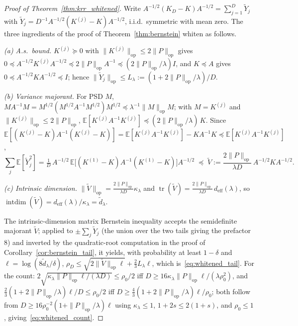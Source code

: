 \documentclass{article}
\begin{document}
\begin{proof}[Proof of Theorem~\ref{thm:krr_whitened}]
Write $A^{-1/2}(K_D-K)A^{-1/2}=\sum_{j=1}^D\widetilde Y_j$ with $\widetilde Y_j=D^{-1}A^{-1/2}(K^{(j)}-K)A^{-1/2}$, i.i.d.\ symmetric with mean zero. The three ingredients of the proof of Theorem~\ref{thm:bernstein} whiten as follows.

\emph{(a) A.s.\ bound.} $K^{(j)}\succeq0$ with $\|K^{(j)}\|_{\mathrm{op}}\le2\|P\|_{\mathrm{op}}$ gives $0\preceq A^{-1/2}K^{(j)}A^{-1/2}\preceq2\|P\|_{\mathrm{op}}A^{-1}\preceq(2\|P\|_{\mathrm{op}}/\lambda)I$, and $K\preceq A$ gives $0\preceq A^{-1/2}KA^{-1/2}\preceq I$; hence $\|\widetilde Y_j\|_{\mathrm{op}}\le L_\lambda:=(1+2\|P\|_{\mathrm{op}}/\lambda)/D$.

\emph{(b) Variance majorant.} For PSD $M$, $MA^{-1}M=M^{1/2}(M^{1/2}A^{-1}M^{1/2})M^{1/2}\preceq\lambda^{-1}\|M\|_{\mathrm{op}}M$; with $M=K^{(j)}$ and $\|K^{(j)}\|_{\mathrm{op}}\le2\|P\|_{\mathrm{op}}$, $\mathbb{E}[K^{(j)}A^{-1}K^{(j)}]\preceq(2\|P\|_{\mathrm{op}}/\lambda)\,K$. Since $\mathbb{E}[(K^{(j)}-K)A^{-1}(K^{(j)}-K)]=\mathbb{E}[K^{(j)}A^{-1}K^{(j)}]-KA^{-1}K\preceq\mathbb{E}[K^{(j)}A^{-1}K^{(j)}]$,
\[
\sum_{j}\mathbb{E}[\widetilde Y_j^2]=\tfrac1D\,A^{-1/2}\,\mathbb{E}\bigl[(K^{(1)}-K)A^{-1}(K^{(1)}-K)\bigr]A^{-1/2}\;\preceq\;\widetilde V:=\frac{2\|P\|_{\mathrm{op}}}{\lambda D}\,A^{-1/2}KA^{-1/2}.
\]

\emph{(c) Intrinsic dimension.} $\|\widetilde V\|_{\mathrm{op}}=\frac{2\|P\|_{\mathrm{op}}}{\lambda D}\kappa_\lambda$ and $\operatorname{tr}(\widetilde V)=\frac{2\|P\|_{\mathrm{op}}}{\lambda D}\,d_{\mathrm{eff}}(\lambda)$, so $\operatorname{intdim}(\widetilde V)=d_{\mathrm{eff}}(\lambda)/\kappa_\lambda=\tilde d_\lambda$.

The intrinsic-dimension matrix Bernstein inequality \citep[Thm.~7.3.1]{tropp2015matrix} accepts the semidefinite majorant $\widetilde V$; applied to $\pm\sum_j\widetilde Y_j$ (the union over the two tails giving the prefactor $8$) and inverted by the quadratic-root computation in the proof of Corollary~\ref{cor:bernstein_tail}, it yields, with probability at least $1-\delta$ and $\ell=\log(8\tilde d_\lambda/\delta)$, $\rho_D\le\sqrt{2\|\widetilde V\|_{\mathrm{op}}\ell}+\tfrac23L_\lambda\ell$, which is~\eqref{eq:whitened_tail}. For the count: $2\sqrt{\kappa_\lambda\|P\|_{\mathrm{op}}\ell/(\lambda D)}\le\rho_0/2$ iff $D\ge16\kappa_\lambda\|P\|_{\mathrm{op}}\ell/(\lambda\rho_0^2)$, and $\tfrac23(1+2\|P\|_{\mathrm{op}}/\lambda)\ell/D\le\rho_0/2$ iff $D\ge\tfrac43(1+2\|P\|_{\mathrm{op}}/\lambda)\ell/\rho_0$; both follow from $D\ge16\rho_0^{-2}(1+\|P\|_{\mathrm{op}}/\lambda)\ell$ using $\kappa_\lambda\le1$, $1+2s\le2(1+s)$, and $\rho_0\le1$, giving~\eqref{eq:whitened_count}.
\end{proof}
\end{document}
